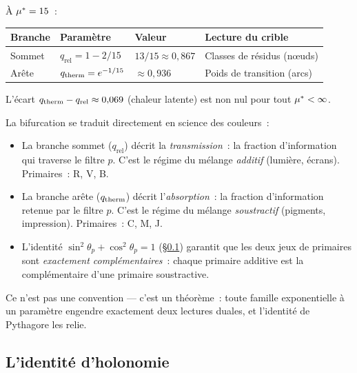 \documentclass[12pt,a4paper]{article}
\providecommand{\qrel}{\ensuremath{q_{\mathrm{rel}}}}
\begin{document}
\`A ${\mu^{*}} = 15$~:
\begin{center}
\begin{tabular}{llll}
\toprule
\textbf{Branche} & \textbf{Param\`etre} & \textbf{Valeur} & \textbf{Lecture du crible} \\
\midrule
Sommet & $\qrel = 1 - 2/15$ & $13/15 \approx 0{,}867$ & Classes de r\'esidus (n\oe{}uds) \\
Ar\^ete & $q_{\mathrm{therm}} = e^{-1/15}$ & $\approx 0{,}936$ & Poids de transition (arcs) \\
\bottomrule
\end{tabular}
\end{center}
L'\'ecart $\qtherm - \qrel \approx 0{,}069$ (chaleur latente) est
non nul pour tout ${\mu^{*}} < \infty$.

\begin{remark}
La bifurcation se traduit directement en science des couleurs~:
\begin{itemize}[nosep]
\item La branche sommet ($\qrel$) d\'ecrit la \emph{transmission}~:
  la fraction d'information qui traverse le filtre $p$. C'est le
  r\'egime du m\'elange \emph{additif} (lumi\`ere, \'ecrans).
  Primaires~: R, V, B.
\item La branche ar\^ete ($q_{\mathrm{therm}}$) d\'ecrit l'\emph{absorption}~:
  la fraction d'information retenue par le filtre $p$. C'est le
  r\'egime du m\'elange \emph{soustractif} (pigments, impression).
  Primaires~: C, M, J.
\item L'identit\'e $\sin^2\!\theta_p + \cos^2\!\theta_p = 1$
  (\S\ref{app:holonomy}) garantit que les deux jeux de primaires
  sont \emph{exactement compl\'ementaires}~: chaque primaire additive
  est la compl\'ementaire d'une primaire soustractive.
\end{itemize}
Ce n'est pas une convention --- c'est un th\'eor\`eme~: toute famille
exponentielle \`a un param\`etre engendre exactement deux lectures
duales, et l'identit\'e de Pythagore les relie.
\end{remark}

\subsection{L'identit\'e d'holonomie}
\label{app:holonomy}
\end{document}
